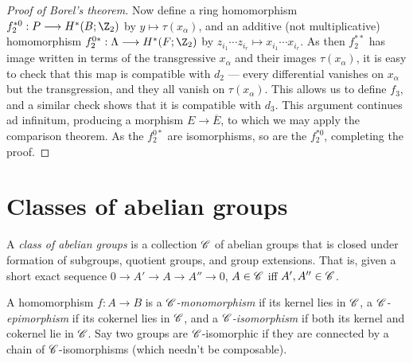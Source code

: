 \documentclass[11pt]{article}
\begin{document}
\begin{proof}[Proof of Borel's theorem]
Now define a ring homomorphism $f_2^{*0}:P\to H^*(B;\Z_2)$ by $y\mapsto \tau(x_\alpha)$, and an additive (not multiplicative) homomorphism $f_2^{0*}:\Lambda\to H^*(F;\Z_2)$ by $z_{i_1}\cdots z_{i_r}\mapsto x_{i_1}\cdots x_{i_r}$. As then $f_2^{**}$ has image written in terms of the transgressive $x_\alpha$ and their images $\tau(x_\alpha)$, it is easy to check that this map is compatible with $d_2$ --- every differential vanishes on $x_\alpha$ but the transgression, and they all vanish on $\tau(x_\alpha)$. This allows us to define $f_3$, and a similar check shows that it is compatible with $d_3$. This argument continues ad infinitum, producing a morphism $E\to\overline E$, to which we may apply the comparison theorem. As the $f_2^{0*}$ are isomorphisms, so are the $f_2^{*0}$, completing the proof.
%
%
\end{proof}

\section{Classes of abelian groups}
A \emph{class of abelian groups} is a collection $\mathscr{C}$ of abelian groups that is closed under formation of subgroups, quotient groups, and group extensions. That is, given a short exact sequence $0\to A'\to A\to A''\to0$, $A\in\mathscr{C}$ iff $A',A''\in\mathscr{C}$.

A homomorphism $f:A\to B$ is a \emph{$\mathscr{C}$-monomorphism} if its kernel lies in $\mathscr{C}$, a \emph{$\mathscr{C}$-epimorphism} if its cokernel lies in $\mathscr{C}$, and a \emph{$\mathscr{C}$-isomorphism} if both its kernel and cokernel lie in $\mathscr{C}$. Say two groups are $\mathscr{C}$-isomorphic if they are connected by a chain of $\mathscr{C}$-isomorphisms (which needn't be composable).
\end{document}
